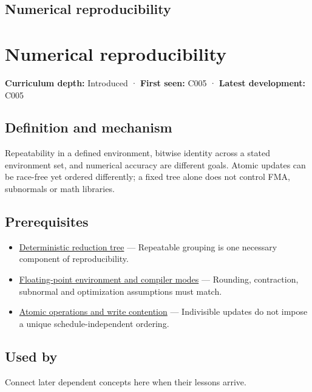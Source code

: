\hypertarget{appendix-5f1a2c3f97ff}{}
\section*{Numerical reproducibility}
\chapter{Numerical reproducibility}\label{appendix-5f1a2c3f97ff-numerical-reproducibility}

\textbf{Curriculum depth:} Introduced · \textbf{First seen:} C005 · \textbf{Latest development:} C005

\section{Definition and mechanism}\label{appendix-5f1a2c3f97ff-definition-and-mechanism}

Repeatability in a defined environment, bitwise identity across a stated environment set, and numerical accuracy are different goals. Atomic updates can be race-free yet ordered differently; a fixed tree alone does not control FMA, subnormals or math libraries.

\section{Prerequisites}\label{appendix-5f1a2c3f97ff-prerequisites}

\begin{itemize}
\tightlist
\item
  \hyperref[appendix-4c8e0238e7ee]{Deterministic reduction tree} --- Repeatable grouping is one necessary component of reproducibility.
\item
  \hyperref[appendix-f11d1a521253]{Floating-point environment and compiler modes} --- Rounding, contraction, subnormal and optimization assumptions must match.
\item
  \hyperref[appendix-e12d1b03fefb]{Atomic operations and write contention} --- Indivisible updates do not impose a unique schedule-independent ordering.
\end{itemize}

\section{Used by}\label{appendix-5f1a2c3f97ff-used-by}

Connect later dependent concepts here when their lessons arrive.

